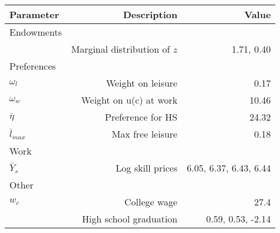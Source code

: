 \begin{tabular}{lrr}
\hline
Parameter & Description  & Value  \\ 
\hline
Endowments &   &   \\ 
 & Marginal distribution of $z$  & 1.71, 0.40  \\ 
Preferences &   &   \\ 
$\omega_{l}$ & Weight on leisure  & 0.17  \\ 
$\omega_{w}$ & Weight on u(c) at work  & 10.46  \\ 
$\bar{\eta}$ & Preference for HS  & 24.32  \\ 
$\bar{l}_{max}$ & Max free leisure  & 0.18  \\ 
Work &   &   \\ 
$\bar{Y}_{s}$ & Log skill prices  & 6.05, 6.37, 6.43, 6.44  \\ 
Other &   &   \\ 
$w_{c}$ & College wage  & 27.4  \\ 
 & High school graduation  & 0.59, 0.53, -2.14  \\ 
\hline
\end{tabular}%
